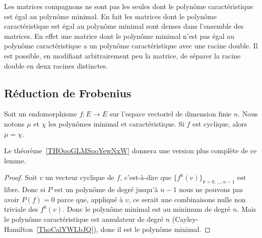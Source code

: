 \begin{remark}  \label{RemmQjZOA}
	Les matrices compagnons ne sont pas les seules dont le polynôme caractéristique est égal au polynôme minimal. En fait les matrices dont le polynôme caractéristique est égal au polynôme minimal sont denses dans l'ensemble des matrices. En effet une matrice dont le polynôme minimal n'est pas égal au polynôme caractéristique a un polynôme caractéristique avec une racine double. Il est possible, en modifiant arbitrairement peu la matrice, de séparer la racine double en deux racines distinctes.
\end{remark}

\subsection{Réduction de Frobenius}

\begin{lemma}       \label{LEMooKUQDooKFeIYq}
	Soit un endomorphisme \( f\colon E\to E\) sur l'espace vectoriel de dimension finie \( n\). Nous notons \( \mu\) et \( \chi\) les polynômes minimal et caractéristique. Si \( f\) est cyclique, alors \( \mu=\chi\).
\end{lemma}
Le théorème~\ref{THOooGLMSooYewNxW} donnera une version plus complète de ce lemme.

\begin{proof}
	Soit \( v\) un vecteur cyclique de \( f\), c'est-à-dire que \( \{ f^k(v) \}_{k=0,\ldots, n-1}\) est libre. Donc si \( P\) est un polynôme de degré jusqu'à \( n-1\) nous ne pouvons pas avoir \( P(f)=0\) parce que, appliqué à \( v\), ce serait une combinaisons nulle non triviale des \( f^k(v)\). Donc le polynôme minimal est au minimum de degré \( n\). Mais le polynôme caractéristique est annulateur de degré \( n\) (Cayley-Hamilton~\ref{ThoCalYWLbJQ}), donc il est le polynôme minimal.
\end{proof}

